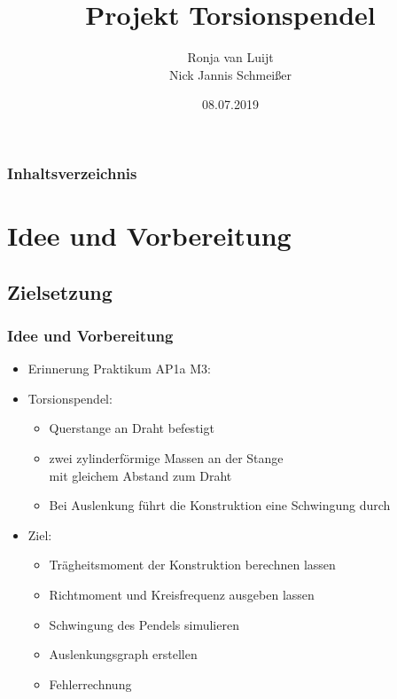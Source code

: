 \documentclass[11pt]{beamer}
\author{Ronja van Luijt\\ Nick Jannis Schmeißer}
\title{Projekt Torsionspendel}
\institute[BUW]{Bergische Universität Wuppertal}
\date{08.07.2019}
\begin{document}
\begin{frame}
\titlepage
\end{frame}

\begin{frame}
\frametitle{Inhaltsverzeichnis}
\tableofcontents
\end{frame}

\section{Idee und Vorbereitung}
\subsection{Zielsetzung}
\begin{frame}
\frametitle{Idee und Vorbereitung}
\begin{itemize}
\item Erinnerung Praktikum AP1a M3:\pause
\item Torsionspendel:
\begin{itemize}
\item Querstange an Draht befestigt
\item zwei zylinderförmige Massen an der Stange\\mit gleichem Abstand zum Draht
\item Bei Auslenkung führt die Konstruktion eine Schwingung durch
\end{itemize}\pause
\item Ziel:
\begin{itemize}
\item Trägheitsmoment der Konstruktion berechnen lassen
\item Richtmoment und Kreisfrequenz ausgeben lassen
\item Schwingung des Pendels simulieren
\item Auslenkungsgraph erstellen
\item Fehlerrechnung
\end{itemize}
\end{itemize}
\end{frame}
\end{document}
